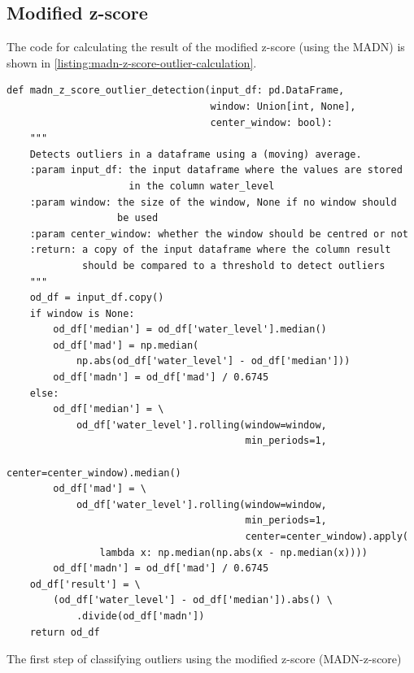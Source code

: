 \subsection{Modified z-score}
The code for calculating the result of the modified z-score (using the \ac{MADN}) is shown in \autoref{listing:madn-z-score-outlier-calculation}.
\begin{listing}[htp]
\small
\begin{verbatim}
def madn_z_score_outlier_detection(input_df: pd.DataFrame,
                                   window: Union[int, None],
                                   center_window: bool):
    """
    Detects outliers in a dataframe using a (moving) average.
    :param input_df: the input dataframe where the values are stored
                     in the column water_level
    :param window: the size of the window, None if no window should
                   be used
    :param center_window: whether the window should be centred or not
    :return: a copy of the input dataframe where the column result
             should be compared to a threshold to detect outliers
    """
    od_df = input_df.copy()
    if window is None:
        od_df['median'] = od_df['water_level'].median()
        od_df['mad'] = np.median(
            np.abs(od_df['water_level'] - od_df['median']))
        od_df['madn'] = od_df['mad'] / 0.6745
    else:
        od_df['median'] = \
            od_df['water_level'].rolling(window=window,
                                         min_periods=1,
                                         center=center_window).median()
        od_df['mad'] = \
            od_df['water_level'].rolling(window=window,
                                         min_periods=1,
                                         center=center_window).apply(
                lambda x: np.median(np.abs(x - np.median(x))))
        od_df['madn'] = od_df['mad'] / 0.6745
    od_df['result'] = \
        (od_df['water_level'] - od_df['median']).abs() \
            .divide(od_df['madn'])
    return od_df
\end{verbatim}
\caption{The first step of classifying outliers using the modified z-score (\ac{MADN}-z-score)}
\label{listing:madn-z-score-outlier-calculation}
\end{listing}

